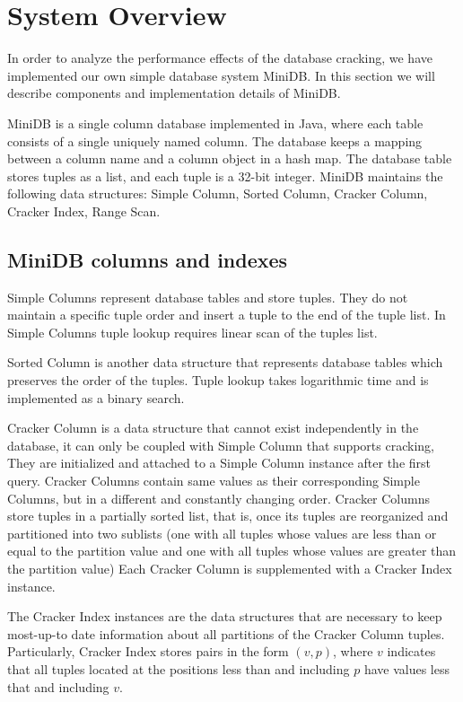 \section{System Overview}
In  order to analyze the performance effects of the database cracking, we have implemented our own simple database system MiniDB. In this section we will describe components and implementation details of MiniDB.

MiniDB is a single column database implemented in Java, where each table consists of a single uniquely named column. The database keeps a mapping between a column name and a  column object in a hash map. The database table stores tuples as a list, and each tuple is a 32-bit integer. MiniDB maintains the following data structures: Simple Column, Sorted Column, Cracker Column, Cracker Index, Range Scan. 

\label{sec:system}

\subsection{MiniDB columns and indexes}


Simple Columns represent database tables and store tuples. They do not maintain a specific tuple order and insert a tuple to the end of the tuple list. In Simple Columns tuple lookup requires linear scan of the tuples list. 

Sorted Column is another data structure that represents database tables  which preserves the order of the tuples. Tuple lookup takes logarithmic time and is implemented as a binary search. 

Cracker Column is a data structure that cannot exist independently in the database, it can only be coupled with Simple Column that supports cracking, They are initialized and attached to a Simple Column instance after the first query. Cracker Columns contain same values as their corresponding Simple Columns, but in a different and constantly changing order. Cracker Columns store tuples in a partially sorted list, that is, once its tuples are reorganized and partitioned into two sublists (one with all tuples whose values are less than or equal to the partition value and one with all tuples whose values are greater than the partition value) Each Cracker Column is supplemented with a  Cracker Index instance. 

The Cracker Index instances are the data structures that are necessary to keep most-up-to date information about all partitions of the Cracker Column tuples. Particularly, Cracker Index stores pairs in the form $(v, p)$, where $v$ indicates that all tuples located at the positions less than and including $p$ have values less that and including $v$.

